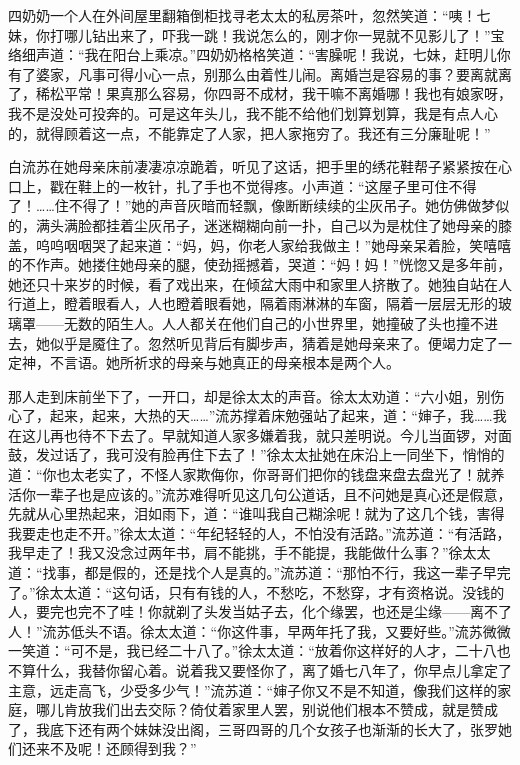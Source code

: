 \par 四奶奶一个人在外间屋里翻箱倒柜找寻老太太的私房茶叶，忽然笑道：“咦！七妹，你打哪儿钻出来了，吓我一跳！我说怎么的，刚才你一晃就不见影儿了！”宝络细声道：“我在阳台上乘凉。”四奶奶格格笑道：“害臊呢！我说，七妹，赶明儿你有了婆家，凡事可得小心一点，别那么由着性儿闹。离婚岂是容易的事？要离就离了，稀松平常！果真那么容易，你四哥不成材，我干嘛不离婚哪！我也有娘家呀，我不是没处可投奔的。可是这年头儿，我不能不给他们划算划算，我是有点人心的，就得顾着这一点，不能靠定了人家，把人家拖穷了。我还有三分廉耻呢！”
\par 白流苏在她母亲床前凄凄凉凉跪着，听见了这话，把手里的绣花鞋帮子紧紧按在心口上，戳在鞋上的一枚针，扎了手也不觉得疼。小声道：“这屋子里可住不得了！……住不得了！”她的声音灰暗而轻飘，像断断续续的尘灰吊子。她仿佛做梦似的，满头满脸都挂着尘灰吊子，迷迷糊糊向前一扑，自己以为是枕住了她母亲的膝盖，呜呜咽咽哭了起来道：“妈，妈，你老人家给我做主！”她母亲呆着脸，笑嘻嘻的不作声。她搂住她母亲的腿，使劲摇撼着，哭道：“妈！妈！”恍惚又是多年前，她还只十来岁的时候，看了戏出来，在倾盆大雨中和家里人挤散了。她独自站在人行道上，瞪着眼看人，人也瞪着眼看她，隔着雨淋淋的车窗，隔着一层层无形的玻璃罩——无数的陌生人。人人都关在他们自己的小世界里，她撞破了头也撞不进去，她似乎是魇住了。忽然听见背后有脚步声，猜着是她母亲来了。便竭力定了一定神，不言语。她所祈求的母亲与她真正的母亲根本是两个人。
\par 那人走到床前坐下了，一开口，却是徐太太的声音。徐太太劝道：“六小姐，别伤心了，起来，起来，大热的天……”流苏撑着床勉强站了起来，道：“婶子，我……我在这儿再也待不下去了。早就知道人家多嫌着我，就只差明说。今儿当面锣，对面鼓，发过话了，我可没有脸再住下去了！”徐太太扯她在床沿上一同坐下，悄悄的道：“你也太老实了，不怪人家欺侮你，你哥哥们把你的钱盘来盘去盘光了！就养活你一辈子也是应该的。”流苏难得听见这几句公道话，且不问她是真心还是假意，先就从心里热起来，泪如雨下，道：“谁叫我自己糊涂呢！就为了这几个钱，害得我要走也走不开。”徐太太道：“年纪轻轻的人，不怕没有活路。”流苏道：“有活路，我早走了！我又没念过两年书，肩不能挑，手不能提，我能做什么事？”徐太太道：“找事，都是假的，还是找个人是真的。”流苏道：“那怕不行，我这一辈子早完了。”徐太太道：“这句话，只有有钱的人，不愁吃，不愁穿，才有资格说。没钱的人，要完也完不了哇！你就剃了头发当姑子去，化个缘罢，也还是尘缘——离不了人！”流苏低头不语。徐太太道：“你这件事，早两年托了我，又要好些。”流苏微微一笑道：“可不是，我已经二十八了。”徐太太道：“放着你这样好的人才，二十八也不算什么，我替你留心着。说着我又要怪你了，离了婚七八年了，你早点儿拿定了主意，远走高飞，少受多少气！”流苏道：“婶子你又不是不知道，像我们这样的家庭，哪儿肯放我们出去交际？倚仗着家里人罢，别说他们根本不赞成，就是赞成了，我底下还有两个妹妹没出阁，三哥四哥的几个女孩子也渐渐的长大了，张罗她们还来不及呢！还顾得到我？”

